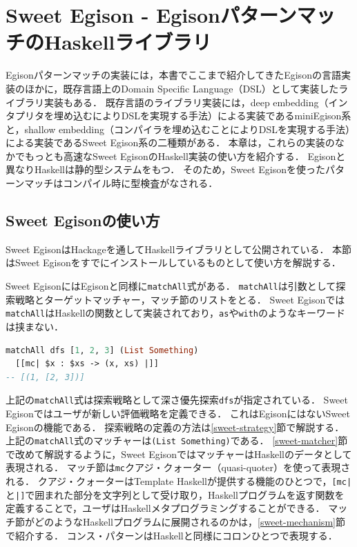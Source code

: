 \chapter{Sweet Egison - EgisonパターンマッチのHaskellライブラリ}\label{sweet}

Egisonパターンマッチの実装には，本書でここまで紹介してきたEgisonの言語実装のほかに，既存言語上のDomain Specific Language（DSL）として実装したライブラリ実装もある．
既存言語のライブラリ実装には，deep embedding（インタプリタを埋め込むによりDSLを実現する手法）による実装であるminiEgison系と，shallow embedding（コンパイラを埋め込むことによりDSLを実現する手法）による実装であるSweet Egison系の二種類がある．
本章は，これらの実装のなかでもっとも高速なSweet EgisonのHaskell実装の使い方を紹介する．
Egisonと異なりHaskellは静的型システムをもつ．
そのため，Sweet Egisonを使ったパターンマッチはコンパイル時に型検査がなされる．

\section{Sweet Egisonの使い方}\label{sweet-match}

Sweet EgisonはHackageを通してHaskellライブラリとして公開されている．
本節はSweet Egisonをすでにインストールしているものとして使い方を解説する．

Sweet EgisonにはEgisonと同様に\lstinline{matchAll}式がある．
\lstinline{matchAll}は引数として探索戦略とターゲットマッチャー，マッチ節のリストをとる．
Sweet Egisonでは\lstinline{matchAll}はHaskellの関数として実装されており，\lstinline{as}や\lstinline{with}のようなキーワードは挟まない．
\begin{lstlisting}[language=haskell,numbers=none]
matchAll dfs [1, 2, 3] (List Something)
  [[mc| $x : $xs -> (x, xs) |]]
-- [(1, [2, 3])]
\end{lstlisting}
上記の\lstinline{matchAll}式は探索戦略として深さ優先探索\lstinline{dfs}が指定されている．
Sweet Egisonではユーザが新しい評価戦略を定義できる．
これはEgisonにはないSweet Egisonの機能である．
探索戦略の定義の方法は\ref{sweet-strategy}節で解説する．
上記の\lstinline{matchAll}式のマッチャーは\lstinline{(List Something)}である．
\ref{sweet-matcher}節で改めて解説するように，Sweet EgisonではマッチャーはHaskellのデータとして表現される．
マッチ節は\lstinline{mc}クアジ・クォーター（quasi-quoter）を使って表現される．
クアジ・クォーターはTemplate Haskellが提供する機能のひとつで，\lstinline{[mc|}と\lstinline{|]}で囲まれた部分を文字列として受け取り，Haskellプログラムを返す関数を定義することで，ユーザはHaskellメタプログラミングすることができる．
マッチ節がどのようなHaskellプログラムに展開されるのかは，\ref{sweet-mechanism}節で紹介する．
コンス・パターンはHaskellと同様にコロンひとつで表現する．

